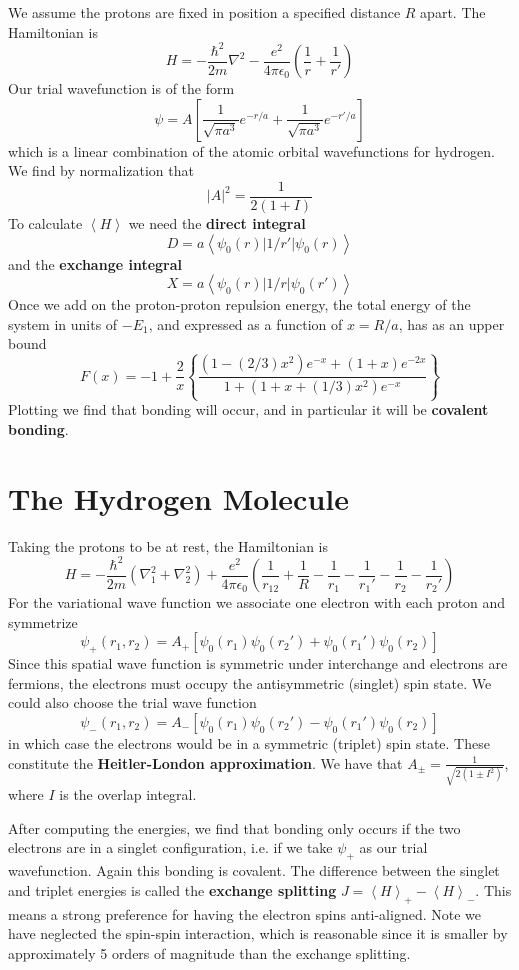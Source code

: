 \documentclass[12pt, a4paper, oneside, openright, titlepage]{book}
\newcommand{\brkt}[1]{\left\langle #1\right\rangle}
\begin{document}
We assume the protons are fixed in position a specified distance $R$ apart. The Hamiltonian is $$H = -\frac{\hbar^2}{2m}\nabla^2-\frac{e^2}{4\pi\epsilon_0}\left(\frac{1}{r}+\frac{1}{r'}\right)$$
Our trial wavefunction is of the form $$\psi = A\left[\frac{1}{\sqrt{\pi a^3}}e^{-r/a}+\frac{1}{\sqrt{\pi a^3}}e^{-r'/a}\right]$$
which is a linear combination of the atomic orbital wavefunctions for hydrogen. We find by normalization that $$|A|^2 = \frac{1}{2(1+I)}$$
To calculate $\brkt{H}$ we need the \textbf{direct integral} $$D = a\brkt{\psi_0(r)|1/r'|\psi_0(r)}$$
and the \textbf{exchange integral} $$X = a\brkt{\psi_0(r)|1/r|\psi_0(r')}$$
Once we add on the proton-proton repulsion energy, the total energy of the system in units of $-E_1$, and expressed as a function of $x = R/a$, has as an upper bound $$F(x) = -1+\frac{2}{x}\left\{\frac{(1-(2/3)x^2)e^{-x}+(1+x)e^{-2x}}{1+(1+x+(1/3)x^2)e^{-x}}\right\}$$
Plotting we find that bonding will occur, and in particular it will be \textbf{covalent bonding}.

\section{The Hydrogen Molecule}

Taking the protons to be at rest, the Hamiltonian is $$H = -\frac{\hbar^2}{2m}\left(\nabla^2_1+\nabla^2_2\right) + \frac{e^2}{4\pi\epsilon_0}\left(\frac{1}{r_{12}}+\frac{1}{R}-\frac{1}{r_1}-\frac{1}{r_1'}-\frac{1}{r_2}-\frac{1}{r_2'}\right)$$
For the variational wave function we associate one electron with each proton and symmetrize $$\psi_+(r_1,r_2) = A_+[\psi_0(r_1)\psi_0(r_2')+\psi_0(r_1')\psi_0(r_2)]$$
Since this spatial wave function is symmetric under interchange and electrons are fermions, the electrons must occupy the antisymmetric (singlet) spin state. We could also choose the trial wave function $$\psi_-(r_1,r_2) = A_-[\psi_0(r_1)\psi_0(r_2')-\psi_0(r_1')\psi_0(r_2)]$$
in which case the electrons would be in a symmetric (triplet) spin state. These constitute the \textbf{Heitler-London approximation}. We have that $A_{\pm} = \frac{1}{\sqrt{2(1\pm I^2)}}$, where $I$ is the overlap integral.

After computing the energies, we find that bonding only occurs if the two electrons are in a singlet configuration, i.e. if we take $\psi_+$ as our trial wavefunction. Again this bonding is covalent. The difference between the singlet and triplet energies is called the \textbf{exchange splitting} $J = \brkt{H}_+ - \brkt{H}_-$. This means a strong preference for having the electron spins anti-aligned. Note we have neglected the spin-spin interaction, which is reasonable since it is smaller by approximately 5 orders of magnitude than the exchange splitting.
\end{document}
